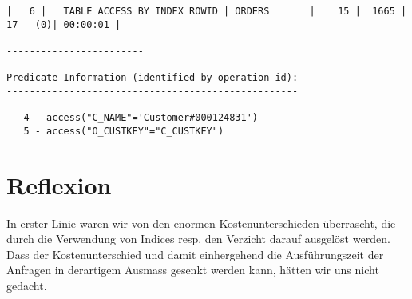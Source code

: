 \documentclass[11pt,a4paper,parskip=half]{scrartcl}
\begin{document}
\begin{lstlisting}
|   6 |   TABLE ACCESS BY INDEX ROWID | ORDERS       |    15 |  1665 |    17   (0)| 00:00:01 |                                                                                                                                                                                                               
----------------------------------------------------------------------------------------------                                                                                                                                                                                                               
                                                                                                                                                                                                                                                                                                             
Predicate Information (identified by operation id):                                                                                                                                                                                                                                                          
---------------------------------------------------                                                                                                                                                                                                                                                          
                                                                                                                                                                                                                                                                                                             
   4 - access("C_NAME"='Customer#000124831')                                                                                                                                                                                                                                                                 
   5 - access("O_CUSTKEY"="C_CUSTKEY")                                                                                                                                                                                                                                                                       
\end{lstlisting}

\section{Reflexion}
In erster Linie waren wir von den enormen Kostenunterschieden überrascht, die durch die Verwendung von Indices resp. den Verzicht darauf ausgelöst werden. Dass der Kostenunterschied und damit einhergehend die Ausführungszeit der Anfragen in derartigem Ausmass gesenkt werden kann, hätten wir uns nicht gedacht.
\end{document}
